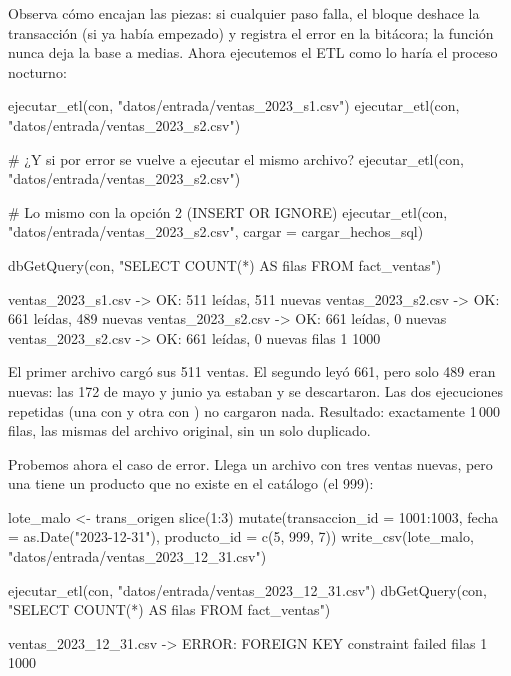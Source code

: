 Observa cómo encajan las piezas: si cualquier paso falla, el bloque
 deshace la transacción (si ya había empezado) y registra el
error en la bitácora; la función nunca deja la base a medias. Ahora
ejecutemos el ETL como lo haría el proceso nocturno:

\begin{rcode}
ejecutar_etl(con, "datos/entrada/ventas_2023_s1.csv")
ejecutar_etl(con, "datos/entrada/ventas_2023_s2.csv")

# ¿Y si por error se vuelve a ejecutar el mismo archivo?
ejecutar_etl(con, "datos/entrada/ventas_2023_s2.csv")

# Lo mismo con la opción 2 (INSERT OR IGNORE)
ejecutar_etl(con, "datos/entrada/ventas_2023_s2.csv",
             cargar = cargar_hechos_sql)

dbGetQuery(con, "SELECT COUNT(*) AS filas FROM fact_ventas")
\end{rcode}

\begin{rsalida}
ventas_2023_s1.csv -> OK: 511 leídas, 511 nuevas 
ventas_2023_s2.csv -> OK: 661 leídas, 489 nuevas 
ventas_2023_s2.csv -> OK: 661 leídas, 0 nuevas 
ventas_2023_s2.csv -> OK: 661 leídas, 0 nuevas 
  filas
1  1000
\end{rsalida}

El primer archivo cargó sus 511 ventas. El segundo leyó 661, pero solo 489
eran nuevas: las 172 de mayo y junio ya estaban y se descartaron. Las dos
ejecuciones repetidas (una con  y otra con
) no cargaron nada. Resultado: exactamente 1\,000
filas, las mismas del archivo original, sin un solo duplicado.

Probemos ahora el caso de error. Llega un archivo con tres ventas nuevas,
pero una tiene un producto que no existe en el catálogo (el 999):

\begin{rcode}
lote_malo <- trans_origen %
  slice(1:3) %
  mutate(transaccion_id = 1001:1003, fecha = as.Date("2023-12-31"),
         producto_id = c(5, 999, 7))
write_csv(lote_malo, "datos/entrada/ventas_2023_12_31.csv")

ejecutar_etl(con, "datos/entrada/ventas_2023_12_31.csv")
dbGetQuery(con, "SELECT COUNT(*) AS filas FROM fact_ventas")
\end{rcode}

\begin{rsalida}
ventas_2023_12_31.csv -> ERROR: FOREIGN KEY constraint failed 
  filas
1  1000
\end{rsalida}

